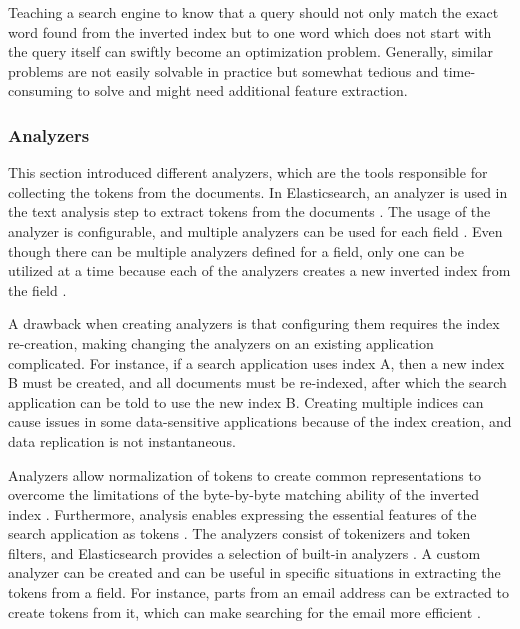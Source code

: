Teaching a search engine to know that a query 
should not only match the exact word found from the inverted index 
but to one word which does not start with the query itself can swiftly become an optimization problem.
Generally, similar problems are not easily solvable in practice but somewhat
tedious and time-consuming to solve and might need additional feature extraction.





\subsubsection{Analyzers}

This section introduced different analyzers, which are the tools responsible
for collecting the tokens from the documents.
In Elasticsearch, an analyzer is used in the text analysis step to extract tokens from the documents \cite{elasticIntro}.
The usage of the analyzer is configurable, and multiple analyzers can be used for each field \cite{relevantSearch}.
Even though there can be multiple analyzers defined for a field, only one can be utilized at a time
because each of the analyzers creates a new inverted index from the field \cite{relevantSearch}.


A drawback when creating analyzers is that configuring them requires the index re-creation, making changing the analyzers 
on an existing application complicated.
For instance, if a search application uses index A, then a new index B must be created, and 
all documents must be re-indexed,
after which the search application can be told to use the new index B.
Creating multiple indices can cause issues in some data-sensitive applications because of the index creation, 
and data replication is not instantaneous.


Analyzers allow normalization of tokens to create common representations to overcome the limitations of the byte-by-byte
matching ability of the inverted index \cite{relevantSearch}.
Furthermore, analysis enables expressing the essential features of the search application as tokens \cite{relevantSearch}.
The analyzers consist of tokenizers and token filters, and Elasticsearch provides a selection of 
built-in analyzers \cite{elasticIntro}.
A custom analyzer can be created and can be useful in specific situations in extracting the tokens from 
a field.
For instance, parts from an email address can be extracted to create tokens from it, 
which can make searching for the email more efficient \cite{relevantSearch}.


